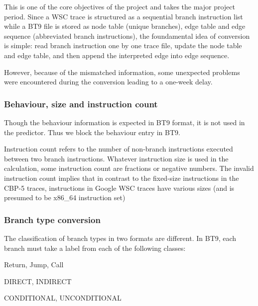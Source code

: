 This is one of the core objectives of the project and takes the major project period. Since a WSC trace is structured as a sequential branch instruction list while a BT9 file is stored as node table (unique branches), edge table and edge sequence (abbreviated branch instructions), the foundamental idea of conversion is simple: read branch instruction one by one trace file, update the node table and edge table, and then append the interpreted edge into edge sequence. \par\hspace*{\fill}\par

However, because of the mismatched information, some unexpected problems were encountered during the conversion leading to a one-week delay.


\subsubsection{Behaviour, size and instruction count}
Though the behaviour information is expected in BT9 format, it is not used in the predictor. Thus we block the behaviour entry in BT9. \par\hspace*{\fill}\par

Instruction count refers to the number of non-branch instructions executed between two branch instructions. Whatever instruction size is used in the calculation, some instruction count are fractions or negative numbers. The invalid instruction count implies that in contrast to the fixed-size instructions in the CBP-5 traces, instructions in Google WSC traces have various sizes (and is presumed to be x86\_64 instruction set)

\subsubsection{Branch type conversion}

The classification of branch types in two formats are different. In BT9, each branch must take a label from each of the following classes:

\begin{description}[itemsep= 0pt,topsep = 0pt, partopsep=4 pt, leftmargin= 32 pt,labelindent=32pt]
\item[Type] \qquad\qquad\qquad Return, Jump, Call
\item[Directness] \qquad\qquad DIRECT, INDIRECT
\item[Conditionality] \qquad CONDITIONAL, UNCONDITIONAL
\end{description}

